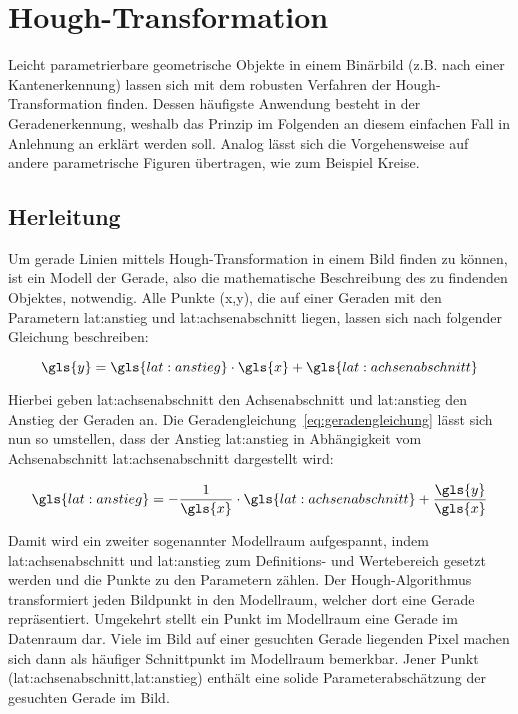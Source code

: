 \section{Hough-Transformation \dcfirstauthorshort}
\label{sec:grundlagen:hough}

Leicht parametrierbare geometrische Objekte in einem Binärbild (z.B. nach einer Kantenerkennung) lassen sich mit dem robusten Verfahren der Hough-Transformation finden. Dessen häufigste Anwendung besteht in der Geradenerkennung, weshalb das Prinzip im Folgenden an diesem einfachen Fall in Anlehnung an \autocite[S.~481f]{jaehneDigitaleBildverarbeitungMit2005} erklärt werden soll. Analog lässt sich die Vorgehensweise auf andere parametrische Figuren übertragen, wie zum Beispiel Kreise.

\subsection{Herleitung}
Um gerade Linien mittels Hough-Transformation in einem Bild finden zu können, ist ein Modell der Gerade, also die mathematische Beschreibung des zu findenden Objektes, notwendig. Alle Punkte (\gls{x},\gls{y}), die auf einer Geraden mit den Parametern \gls{lat:anstieg} und \gls{lat:achsenabschnitt} liegen, lassen sich nach folgender Gleichung beschreiben:

\begin{equation}
\gls{y} = \gls{lat:anstieg} \cdot \gls{x} + \gls{lat:achsenabschnitt}
\label{eq:geradengleichung}
\end{equation}

Hierbei geben \gls{lat:achsenabschnitt} den Achsenabschnitt und \gls{lat:anstieg} den Anstieg der Geraden an. Die Geradengleichung~\eqref{eq:geradengleichung} lässt sich nun so umstellen, dass der Anstieg \gls{lat:anstieg} in Abhängigkeit vom Achsenabschnitt \gls{lat:achsenabschnitt}  dargestellt wird:

\begin{equation}
\gls{lat:anstieg} = -\frac{1}{\gls{x}} \cdot \gls{lat:achsenabschnitt} + \frac{\gls{y}}{\gls{x}}
\end{equation}

Damit wird ein zweiter sogenannter Modellraum aufgespannt, indem \gls{lat:achsenabschnitt} und \gls{lat:anstieg} zum Definitions- und Wertebereich gesetzt werden und die Punkte zu den Parametern zählen. Der Hough-Algorithmus transformiert jeden Bildpunkt in den Modellraum, welcher dort eine Gerade repräsentiert. Umgekehrt stellt ein Punkt im Modellraum eine Gerade im Datenraum dar. Viele im Bild auf einer gesuchten Gerade liegenden Pixel machen sich dann als häufiger Schnittpunkt im Modellraum bemerkbar. Jener Punkt (\gls{lat:achsenabschnitt},\gls{lat:anstieg}) enthält eine solide Parameterabschätzung der gesuchten Gerade im Bild.

